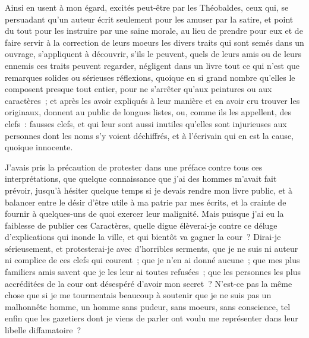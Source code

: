 \documentclass[french,twoside]{book} %
\begin{document}
Ainsi en usent à mon égard, excités peut-être par les Théobaldes, ceux qui, se persuadant qu’un auteur écrit seulement pour les amuser par la satire, et point du tout pour les instruire par une saine morale, au lieu de prendre pour eux et de faire servir à la correction de leurs moeurs les divers traits qui sont semés dans un ouvrage, s’appliquent à découvrir, s’ils le peuvent, quels de leurs amis ou de leurs ennemis ces traits peuvent regarder, négligent dans un livre tout ce qui n’est que remarques solides ou sérieuses réflexions, quoique en si grand nombre qu’elles le composent presque tout entier, pour ne s’arrêter qu’aux peintures ou aux caractères ; et après les avoir expliqués à leur manière et en avoir cru trouver les originaux, donnent au public de longues listes, ou, comme ils les appellent, des clefs : fausses clefs, et qui leur sont aussi inutiles qu’elles sont injurieuses aux personnes dont les noms s’y voient déchiffrés, et à l’écrivain qui en est la cause, quoique innocente.\par
J'avais pris la précaution de protester dans une préface contre tous ces interprétations, que quelque connaissance que j’ai des hommes m’avait fait prévoir, jusqu’à hésiter quelque temps si je devais rendre mon livre public, et à balancer entre le désir d’être utile à ma patrie par mes écrits, et la crainte de fournir à quelques-uns de quoi exercer leur malignité. Mais puisque j’ai eu la faiblesse de publier ces Caractères, quelle digue élèverai-je contre ce déluge d’explications qui inonde la ville, et qui bientôt va gagner la cour ? Dirai-je sérieusement, et protesterai-je avec d’horribles serments, que je ne suis ni auteur ni complice de ces clefs qui courent ; que je n’en ai donné aucune ; que mes plus familiers amis savent que je les leur ai toutes refusées ; que les personnes les plus accréditées de la cour ont désespéré d’avoir mon secret ? N'est-ce pas la même chose que si je me tourmentais beaucoup à soutenir que je ne suis pas un malhonnête homme, un homme sans pudeur, sans moeurs, sans conscience, tel enfin que les gazetiers dont je viens de parler ont voulu me représenter dans leur libelle diffamatoire ?\par
\end{document}
